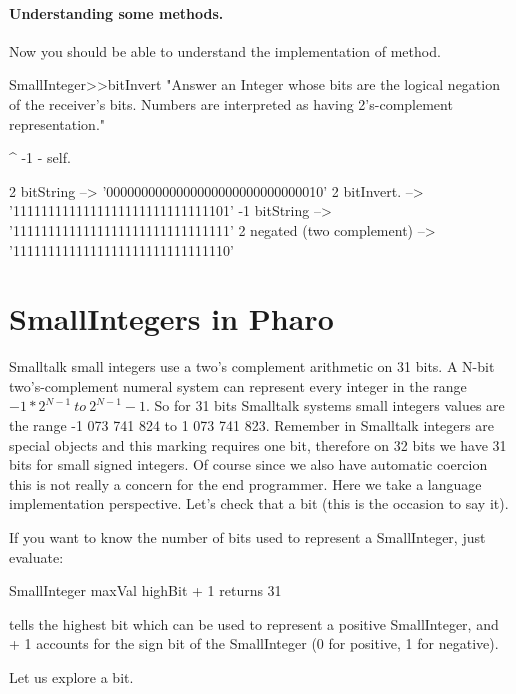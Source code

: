 \documentclass[a4paper,10pt,twoside]{book}
\begin{document}
\paragraph{Understanding some methods.}
Now you should be able to understand the implementation of  method.

\begin{code}{}
SmallInteger>>bitInvert
    "Answer an Integer whose bits are the logical negation of the receiver's bits.
    Numbers are interpreted as having 2's-complement representation."

	^ -1 - self.
\end{code}

\begin{code}{}
2 bitString
	--> '0000000000000000000000000000010'
2 bitInvert.
	--> '1111111111111111111111111111101'
-1 bitString
	--> '1111111111111111111111111111111'
2 negated (two complement)
	--> '1111111111111111111111111111110'
\end{code}


\section{SmallIntegers in Pharo}

Smalltalk small integers use a two's complement arithmetic on 31 bits.  A N-bit two's-complement numeral system can represent every integer in the range $-1 * 2^{N-1}\ to\ 2^{N-1}-1$. So for 31 bits Smalltalk systems small integers values are the range -1 073 741 824 to  1 073 741 823.  Remember in Smalltalk integers are special objects and this marking requires one bit, therefore on 32 bits we have 31 bits for small signed integers. Of course since we also have automatic coercion this is not really a concern for the end programmer. Here we take a language implementation perspective.
 Let's check that a bit (this is the occasion to say it). 

If you want to know the number of bits used to represent a
SmallInteger, just evaluate:

\begin{code}{}
SmallInteger maxVal highBit + 1
	returns 31
\end{code}

 tells the highest bit which can be used to
represent a positive SmallInteger, and + 1 accounts for the sign bit
of the SmallInteger (0 for positive, 1 for negative).


Let us explore a bit. 
\end{document}
